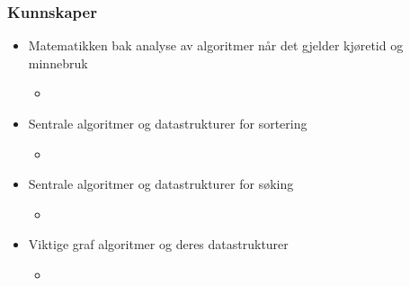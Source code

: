 \documentclass{article}
\begin{document}
    \subsubsection{Kunnskaper}
    \begin{itemize}
        \item Matematikken bak analyse av algoritmer når det gjelder kjøretid og minnebruk
            \begin{itemize}
                \item \color{red}{Big \( O \) (Kapittel 1)}
            \end{itemize}
        \item Sentrale algoritmer og datastrukturer for sortering
            \begin{itemize}
                \item \color{red}{Mergesort, Quicksort og Heap (Kapittel 2)}
            \end{itemize}
        \item Sentrale algoritmer og datastrukturer for søking
            \begin{itemize}
                \item \color{red}{Binærsøk + Heap (Kapittel 3)}
            \end{itemize}
        \item Viktige graf algoritmer og deres datastrukturer
            \begin{itemize}
                \item \color{red}{Kapittel 4}
            \end{itemize}
    \end{itemize}
\end{document}
